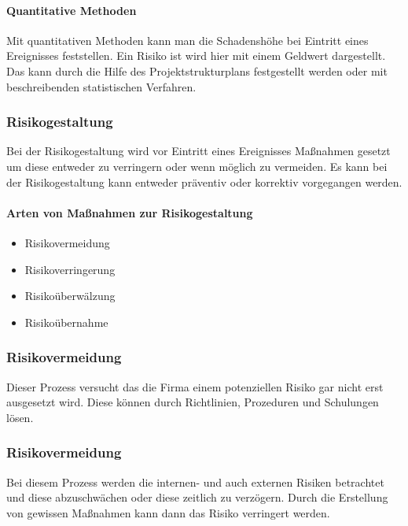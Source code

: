 \paragraph{Quantitative Methoden}
Mit quantitativen Methoden kann man die Schadenshöhe bei Eintritt eines Ereignisses feststellen. Ein Risiko ist wird hier mit einem Geldwert dargestellt.
Das kann durch die Hilfe des Projektstrukturplans festgestellt werden oder mit beschreibenden statistischen Verfahren.


\subsubsection{Risikogestaltung}
Bei der Risikogestaltung wird vor Eintritt eines Ereignisses Maßnahmen gesetzt um diese entweder zu verringern oder wenn möglich zu vermeiden.
Es kann bei der Risikogestaltung kann entweder präventiv oder korrektiv vorgegangen werden.

\paragraph{Arten von Maßnahmen zur Risikogestaltung}
\begin{itemize}
	\item Risikovermeidung
	\item Risikoverringerung
	\item Risikoüberwälzung
	\item Risikoübernahme
\end{itemize}

\subsubsection{Risikovermeidung}
Dieser Prozess versucht das die Firma einem potenziellen Risiko gar nicht erst ausgesetzt wird. Diese können durch Richtlinien, Prozeduren und Schulungen lösen.

\subsubsection{Risikovermeidung}
Bei diesem Prozess werden die internen- und auch externen Risiken betrachtet und diese abzuschwächen oder diese zeitlich zu verzögern. Durch die Erstellung von gewissen Maßnahmen kann dann das Risiko verringert werden.

